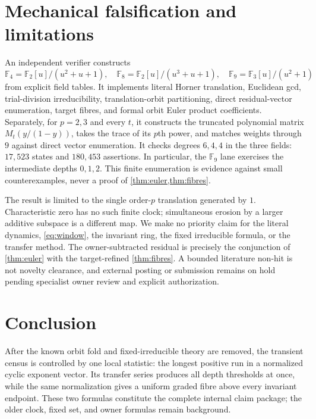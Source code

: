 \documentclass[10pt,a4paper]{amsart}
\theoremstyle{definition}
\theoremstyle{remark}
\newcommand{\F}{\mathbb F}
\begin{document}
\section{Mechanical falsification and limitations}
\enlargethispage{3\baselineskip}

An independent verifier constructs
\[
 \F_4=\F_2[u]/(u^2+u+1),\quad
 \F_8=\F_2[u]/(u^3+u+1),\quad
 \F_9=\F_3[u]/(u^2+1)
\]
from explicit field tables.  It implements literal Horner translation,
Euclidean gcd, trial-division irreducibility, translation-orbit
partitioning, direct residual-vector enumeration, target fibres, and formal
orbit Euler product coefficients.  Separately, for $p=2,3$ and every $t$, it
constructs the truncated polynomial matrix $M_t(y/(1-y))$, takes the trace
of its $p$th power, and matches weights through $9$ against direct vector
enumeration.  It checks degrees $6,4,4$ in the three fields: $17{,}523$
states and $180{,}453$ assertions.  In particular, the $\F_9$ lane exercises the
intermediate depths $0,1,2$.  This finite enumeration is evidence against
small counterexamples, never a proof of
\cref{thm:euler,thm:fibres}.

The result is limited to the single order-$p$ translation generated by
$1$.  Characteristic zero has no such finite clock; simultaneous erosion by
a larger additive subspace is a different map.  We make no priority claim
for the literal dynamics, \eqref{eq:window}, the invariant ring, the fixed
irreducible formula, or the transfer method.  The owner-subtracted residual
is precisely the conjunction of \cref{thm:euler} with the target-refined
\cref{thm:fibres}.  A bounded literature non-hit is not novelty clearance,
and external posting or submission remains on hold pending specialist owner
review and explicit authorization.

\section{Conclusion}

After the known orbit fold and fixed-irreducible theory are removed, the
transient census is controlled by one local statistic: the longest positive
run in a normalized cyclic exponent vector.  Its transfer series produces
all depth thresholds at once, while the same normalization gives a uniform
graded fibre above every invariant endpoint.  These two formulas constitute
the complete internal claim package; the older clock, fixed set, and owner
formulas remain background.

\renewcommand{\bibfont}{\scriptsize}


\end{document}
